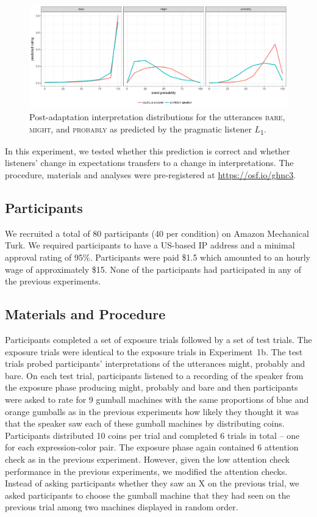 \documentclass[lucida,biblatex]{sp} %
\begin{document}
\begin{figure}
  \includegraphics[width=\textwidth]{plots/adaptation-posterior-comp.pdf}
  \caption{Post-adaptation interpretation distributions for the utterances  \textsc{bare}, \textsc{might}, and \textsc{probably} as predicted by the pragmatic listener $L$\textsubscript{$1$}. \label{fig:post-exposure-comp}}
\end{figure}

In this experiment, we tested whether this prediction is correct and whether listeners' change in expectations transfers to a change in interpretations. 
The procedure, materials and analyses were pre-registered at \url{https://osf.io/ghnc3}.

\subsection{Participants}

We recruited a total of 80 participants (40 per condition) on Amazon Mechanical Turk. We required participants to have a US-based IP address and a minimal approval rating of 95\%. Participants were paid \$1.5 which amounted to an hourly wage of approximately \$15. None of the participants had participated in any of the previous experiments. 

\subsection{Materials and Procedure}

Participants completed a set of exposure trials followed by a set of test trials. The exposure trials were identical to the exposure trials in Experiment~1b. The test trials probed participants' interpretations of the utterances {\sc might}, {\sc probably} and {\sc bare}. On each test trial, participants listened to a recording of the speaker from the exposure phase producing {\sc might}, {\sc probably} and {\sc bare} and then participants were asked to rate for 9 gumball machines with the same proportions of blue and orange gumballs as in the previous experiments how likely they thought it was that the speaker saw each of these gumball machines by distributing coins.  Participants distributed 10 coins per trial and completed 6 trials in total  -- one for each expression-color pair. The exposure phase again contained  6 attention check as in the previous experiment. However, given the low attention check performance in the previous experiments, we modified the attention checks. Instead of asking participants whether they saw an X on the previous trial, we asked participants to choose the gumball machine that they had seen on the previous trial among two machines displayed in random order.
\end{document}
